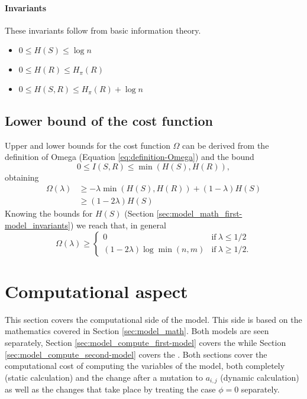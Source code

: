 \paragraph{Invariants} These invariants follow from basic information theory.
\cite{Cover1999}

\begin{itemize}
\item $0 \leq H(S) \leq \log n$
\item $0 \leq H(R) \leq H_\pi(R)$
\item $0 \leq H(S,R) \leq H_\pi(R) + \log n$
\end{itemize}

\subsection{Lower bound of the cost function}

Upper and lower bounds for the cost function $\Omega$ can be derived from the definition of Omega (Equation \eqref{eq:definition-Omega}) and the bound \cite{Cover1999}
\begin{equation*}
  0 \leq I(S,R) \leq \min(H(S),H(R)),
\end{equation*}
obtaining
\begin{align*}
  \Omega(\lambda) &\geq -\lambda \min(H(S),H(R)) + (1-\lambda) H(S) \\
                  &\geq (1-2\lambda)H(S)
\end{align*}
Knowing the bounds for $H(S)$ (Section \ref{sec:model_math_first-model_invariants}) we reach that, in general
\begin{equation}
  \label{eq:lower-bound-Omega}
  \Omega(\lambda) \geq
  \begin{cases}
    0                           & \text{if}~\lambda \leq 1/2 \\
    (1-2\lambda) \log \min(n,m) & \text{if}~\lambda \geq 1/2.
  \end{cases}
\end{equation}

\section{Computational aspect}
\label{sec:model_compute}

This section covers the computational side of the model.
This side is based on the mathematics covered in Section \ref{sec:model_math}.
Both models are seen separately, Section \ref{sec:model_compute_first-model} covers the \firstmodel{} while Section \ref{sec:model_compute_second-model} covers the \secondmodel{}.
Both sections cover the computational cost of computing the variables of the model, both completely (static calculation) and the change after a mutation to $a_{i,j}$ (dynamic calculation) as well as the changes that take place by treating the case $\phi=0$ separately.

